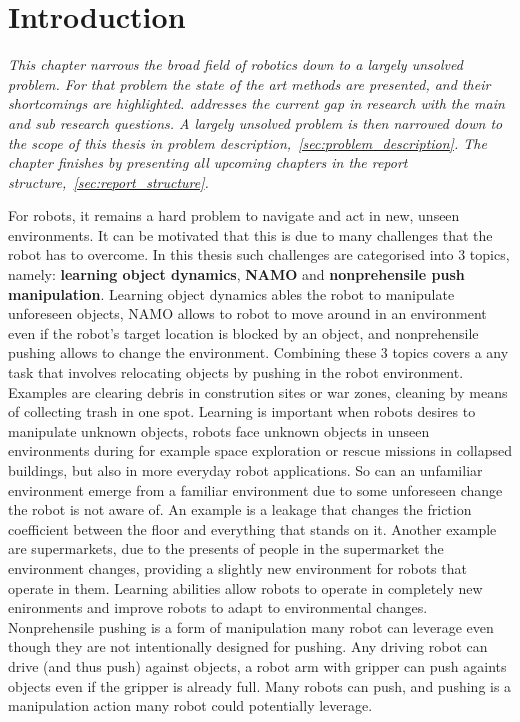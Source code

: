 \chapter{Introduction}%
\label{chap:introduction}
\textit{This chapter narrows the broad field of robotics down to a largely unsolved problem. For that problem the state of the art methods are presented, and their shortcomings are highlighted.  addresses the current gap in research with the main and sub research questions. A largely unsolved problem is then narrowed down to the scope of this thesis in problem description,~\cref{sec:problem_description}. The chapter finishes by presenting all upcoming chapters in the report structure,~\cref{sec:report_structure}.\bs}



For robots, it remains a hard problem to navigate and act in new, unseen environments. It can be motivated that this is due to many challenges that the robot has to overcome. In this thesis such challenges are categorised into 3 topics, namely: \textbf{learning object dynamics}, \textbf{\ac{NAMO}} and \textbf{nonprehensile push manipulation}. Learning object dynamics ables the robot to manipulate unforeseen objects, \ac{NAMO} allows to robot to move around in an environment even if the robot's target location is blocked by an object, and nonprehensile pushing allows to change the environment. Combining these 3 topics covers a any task that involves relocating objects by pushing in the robot environment. Examples are clearing debris in constrution sites or war zones, cleaning by means of collecting trash in one spot. Learning is important when robots desires to manipulate unknown objects, robots face unknown objects in unseen environments during for example space exploration or rescue missions in collapsed buildings, but also in more everyday robot applications. So can an unfamiliar environment emerge from a familiar environment due to some unforeseen change the robot is not aware of. An example is a leakage that changes the friction coefficient between the floor and everything that stands on it. Another example are supermarkets, due to the presents of people in the supermarket the environment changes, providing a slightly new environment for robots that operate in them. Learning abilities allow robots to operate in completely new enironments and improve robots to adapt to environmental changes. Nonprehensile pushing is a form of manipulation many robot can leverage even though they are not intentionally designed for pushing. Any driving robot can drive (and thus push) against objects, a robot arm with gripper can push againts objects even if the gripper is already full. Many robots can push, and pushing is a manipulation action many robot could potentially leverage.\bs

